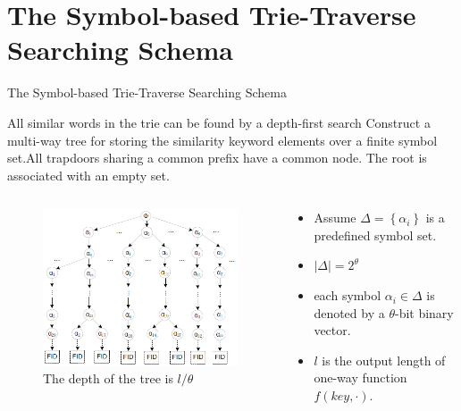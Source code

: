 \documentclass{beamer}
\begin{document}
\section{The Symbol-based Trie-Traverse Searching Schema}

\begin{frame}{The Symbol-based Trie-Traverse Searching Schema}
	\begin{block}{All similar words in the trie can be found by a depth-first search}
		Construct a multi-way tree for storing the similarity keyword elements over a finite symbol set.All trapdoors sharing a common prefix have a common node.	The root is associated with an empty set. 
	\end{block}
	\begin{columns}
    \begin{figure}
      \includegraphics[width=\textwidth]{fig2.jpg}
      \caption{The depth of the tree is $l/\theta$}
    \end{figure}
    \begin{exampleblock}{}
    	\begin{itemize}
    		\item Assume $\Delta  = \left\{ {{\alpha _i}} \right\}$ is a predefined symbol set.
    		\item $\left| \Delta  \right| = {2^\theta }$
    		\item each symbol ${\alpha _i} \in \Delta $ is denoted by a $\theta$-bit binary vector.
    		\item $l$ is the output length of one-way function $f(key, \cdot )$.
    	\end{itemize}
    	
    \end{exampleblock}
    \end{columns}
\end{frame}
\end{document}
